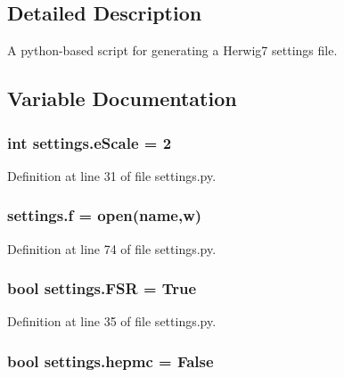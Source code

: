 \subsection{Detailed Description}
A python-\/based script for generating a Herwig7 settings file. 

\subsection{Variable Documentation}
\subsubsection[{\texorpdfstring{e\+Scale}{eScale}}]{\setlength{\rightskip}{0pt plus 5cm}int settings.\+e\+Scale = 2}\hypertarget{namespacesettings_ae5853b0ece109429ba3e5fdbbaea4cb3}{}\label{namespacesettings_ae5853b0ece109429ba3e5fdbbaea4cb3}


Definition at line 31 of file settings.\+py.

\subsubsection[{\texorpdfstring{f}{f}}]{\setlength{\rightskip}{0pt plus 5cm}settings.\+f = open({\bf name},\textquotesingle{}w\textquotesingle{})}\hypertarget{namespacesettings_a7f8f246eb917372c33fb5f296093ff70}{}\label{namespacesettings_a7f8f246eb917372c33fb5f296093ff70}


Definition at line 74 of file settings.\+py.

\subsubsection[{\texorpdfstring{F\+SR}{FSR}}]{\setlength{\rightskip}{0pt plus 5cm}bool settings.\+F\+SR = True}\hypertarget{namespacesettings_ac98d9a0de50c24fd4cc8ca6329a3e0c6}{}\label{namespacesettings_ac98d9a0de50c24fd4cc8ca6329a3e0c6}


Definition at line 35 of file settings.\+py.

\subsubsection[{\texorpdfstring{hepmc}{hepmc}}]{\setlength{\rightskip}{0pt plus 5cm}bool settings.\+hepmc = False}\hypertarget{namespacesettings_a594c41de23324522b6d9c80046032a95}{}\label{namespacesettings_a594c41de23324522b6d9c80046032a95}


